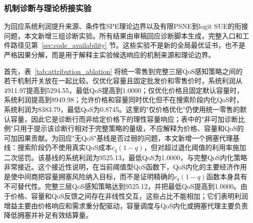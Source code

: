 \documentclass[UTF8,11pt]{ctexart}
\begin{document}
\subsubsection{机制诊断与理论桥接实验}
\label{sec:reviewer_response_diagnostics}

为回应系统利润提升来源、条件性SPE理论边界以及有限PSNE到logit SUE的衔接问题，本文新增三组诊断实验。所有结果由审稿回应诊断脚本生成，完整入口和工件路径见第~\ref{sec:code_availability} 节。这些实验不是新的全局最优证书，也不是严格因果分解，而是用于解释主实验候选响应的机制来源和理论边界。

首先，表~\ref{tab:attribution_ablation} 将统一零售到完整三层QoS感知策略之间的若干机制开关放在一起比较。仅优化容量且固定批发价和零售价时，系统利润从4911.97提高到5294.55，最低QoS提高到1.0000；仅优化价格且固定默认容量时，系统利润提高到8949.98；允许价格和容量同时优化但不在搜索阶段内化QoS时，系统利润为8383.79，最低QoS为0.8745。这里的"仅价格优化"仍使用统一零售的默认容量，因此它是诊断行而非给定价格下的理性容量响应；表中的"非可加诊断比例"只用于提示该诊断行相对于完整策略的量级，不应解释为价格、容量和QoS的可加因果贡献。为回应"无QoS"基线是否过弱的问题，本文新增一个拥塞代理基线：搜索阶段仍不使用真实QoS成本$c_q(1-q)$，但对超过退化阈值的利用率施加二次惩罚。该基线的系统利润为9525.13，最低QoS为1.0000，与完整QoS内化策略非常接近。这个接近性说明，在当前阈值型QoS函数下，QoS内化的主要经济作用是使中间商把容量拥塞风险纳入目标，而不是证明精确的$c_q(1-q)$函数本身具有不可替代性。完整三层QoS感知策略达到9525.12，并把最低QoS提高到1.0000。由于价格、容量和QoS反馈之间存在非线性交互，这些占比不能相加；它们表明利润增益主要由价格响应和需求重分配驱动，容量调度与QoS内化或拥塞代理主要负责降低拥塞并补足有效结算量。

\begin{table}[H]
\centering
\caption{系统利润提升的诊断性消融。非可加诊断比例不是可加因果分解。}
\label{tab:attribution_ablation}
\small
{}
\end{table}
\end{document}
